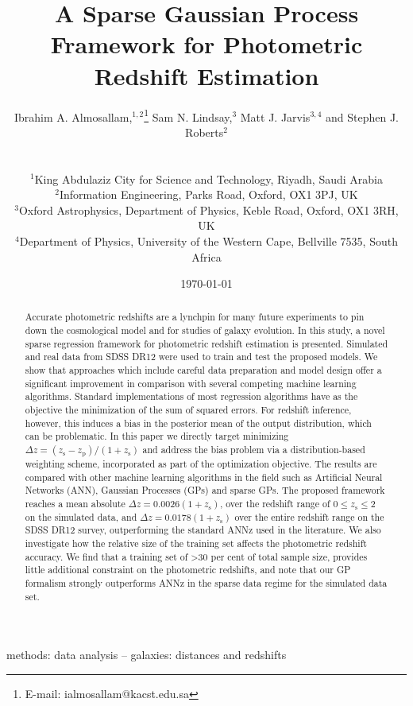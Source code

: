 \documentclass[useAMS,usenatbib,fleqn]{mn2e}
\title[A Sparse GP Framework for Photometric Redshift]{A Sparse Gaussian Process Framework for Photometric Redshift Estimation}
\author[Almosallam et al.]
{\parbox{\textwidth}{Ibrahim A. Almosallam,$^{1,2}$\thanks{E-mail: ialmosallam@kacst.edu.sa} Sam N. Lindsay,$^{3}$ Matt J. Jarvis$^{3,4}$ and Stephen J. Roberts$^{2}$
}
\vspace{0.4cm}\\
\parbox{\textwidth}{
$^1$King Abdulaziz City for Science and Technology, Riyadh, Saudi Arabia\\
$^2$Information Engineering, Parks Road, Oxford, OX1 3PJ, UK\\
$^3$Oxford Astrophysics, Department of Physics, Keble Road, Oxford, OX1 3RH, UK\\
$^4$Department of Physics, University of the Western Cape, Bellville 7535, South Africa\\
}}
\begin{document}
\date{\today}

\pagerange{\pageref{firstpage}--\pageref{lastpage}} 

\maketitle

\label{firstpage}

\begin{abstract}
Accurate photometric redshifts are a lynchpin for many future experiments to pin down the cosmological model and for studies of galaxy evolution. In this study, a novel sparse regression framework for photometric redshift estimation is presented. Simulated and real data from SDSS DR12 were used to train and test the proposed models. We show that approaches which include careful data preparation and model design offer a significant improvement in comparison with several competing machine learning algorithms. Standard implementations of most regression algorithms have as the objective the minimization of the sum of squared errors. For redshift inference, however, this induces a bias in the posterior mean of the output distribution, which can be problematic. In this paper we directly target minimizing $\Delta z = (z_\textrm{s} - z_\textrm{p})/(1+z_\textrm{s})$ and address the bias problem via a distribution-based weighting scheme, incorporated as part of the optimization objective. The results are compared with other machine learning algorithms in the field such as Artificial Neural Networks (ANN), Gaussian Processes (GPs) and sparse GPs. The proposed framework reaches a mean absolute $\Delta z = 0.0026(1+z_\textrm{s})$, over the redshift range of $0 \le z_\textrm{s} \le 2$ on the simulated data, and $\Delta z = 0.0178(1+z_\textrm{s})$ over the entire redshift range on the SDSS DR12 survey, outperforming the standard {\sc ANNz} used in the literature. We also investigate how the relative  size of the training set affects the photometric redshift accuracy. We find that a training set of \textgreater 30 per cent of total sample size, provides little additional constraint on the photometric redshifts, and note that our GP formalism strongly outperforms {\sc ANNz} in the sparse data regime for the simulated data set.

\end{abstract}

\begin{keywords}
methods: data analysis -- galaxies: distances and redshifts
\end{keywords}
\end{document}
